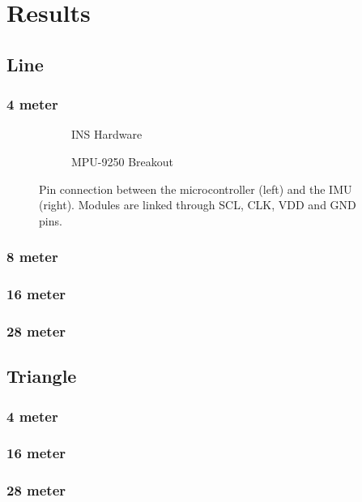 \section{Results}
\subsection{Line}
\subsubsection{4 meter}
\begin{figure}[!h]
    \centering
    \begin{subfigure}{0.49\textwidth}
        \centering
        \resizebox{1\linewidth}{!}{}
        \caption{INS Hardware}
        \label{fig:sub1}
    \end{subfigure}
    \begin{subfigure}{0.49\textwidth}
        \centering
        \resizebox{1\linewidth}{!}{}
        \caption{MPU-9250 Breakout}
        \label{fig:sub2}
    \end{subfigure}
    \caption{Pin connection between the microcontroller (left) and the IMU (right). Modules are linked through SCL, CLK, VDD and GND pins.}
    \label{fig:mag_calibration_output}
\end{figure}
\subsubsection{8 meter}
\subsubsection{16 meter}
\subsubsection{28 meter}
\subsection{Triangle}
\subsubsection{4 meter}
\subsubsection{16 meter}
\subsubsection{28 meter}
